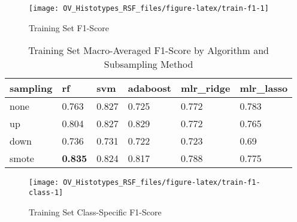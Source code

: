 \documentclass[
]{report}
\begin{document}
\begin{figure}[H]

{\centering \texttt{[image: OV\_Histotypes\_RSF\_files/figure-latex/train-f1-1]} 

}

\caption{Training Set F1-Score}\label{fig:train-f1}
\end{figure}

\begin{table}

\caption{\label{tab:train-f1-table}Training Set Macro-Averaged F1-Score by Algorithm and Subsampling Method}
\centering
\begin{tabular}[t]{l|l|l|l|l|l}
\hline
sampling & rf & svm & adaboost & mlr\_ridge & mlr\_lasso\\
\hline
none & 0.763 & 0.827 & 0.725 & 0.772 & 0.783\\
\hline
up & 0.804 & 0.827 & 0.829 & 0.772 & 0.765\\
\hline
down & 0.736 & 0.731 & 0.722 & 0.723 & 0.69\\
\hline
smote & \textbf{0.835} & 0.824 & 0.817 & 0.788 & 0.775\\
\hline
\end{tabular}
\end{table}

\begin{figure}[H]

{\centering \texttt{[image: OV\_Histotypes\_RSF\_files/figure-latex/train-f1-class-1]} 

}

\caption{Training Set Class-Specific F1-Score}\label{fig:train-f1-class}
\end{figure}
\end{document}
